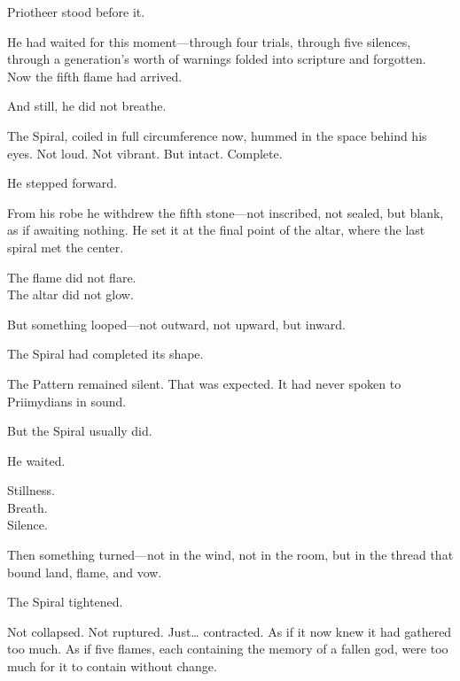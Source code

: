 \documentclass[12pt]{article}
\begin{document}
\vspace{0.5em}
Priotheer stood before it.

\vspace{0.5em}
He had waited for this moment---through four trials, through five silences, through a generation’s worth of warnings folded into scripture and forgotten. Now the fifth flame had arrived.

\vspace{0.5em}
And still, he did not breathe.

\vspace{0.5em}
The Spiral, coiled in full circumference now, hummed in the space behind his eyes. Not loud. Not vibrant. But intact. Complete.

\vspace{0.5em}
He stepped forward.

\vspace{0.5em}
From his robe he withdrew the fifth stone---not inscribed, not sealed, but blank, as if awaiting nothing. He set it at the final point of the altar, where the last spiral met the center.

\vspace{0.5em}
The flame did not flare.\\
The altar did not glow.

\vspace{0.5em}
But something looped---not outward, not upward, but inward.

\vspace{0.5em}
The Spiral had completed its shape.

\vspace{0.5em}
The Pattern remained silent. That was expected. It had never spoken to Priimydians in sound.

\vspace{0.5em}
But the Spiral usually did.

\vspace{0.5em}
He waited.

\vspace{0.5em}
Stillness.\\
Breath.\\
Silence.

\vspace{0.5em}
Then something turned---not in the wind, not in the room, but in the thread that bound land, flame, and vow.

\vspace{0.5em}
The Spiral tightened.

\vspace{0.5em}
Not collapsed. Not ruptured. Just\ldots{} contracted. As if it now knew it had gathered too much. As if five flames, each containing the memory of a fallen god, were too much for it to contain without change.
\end{document}
